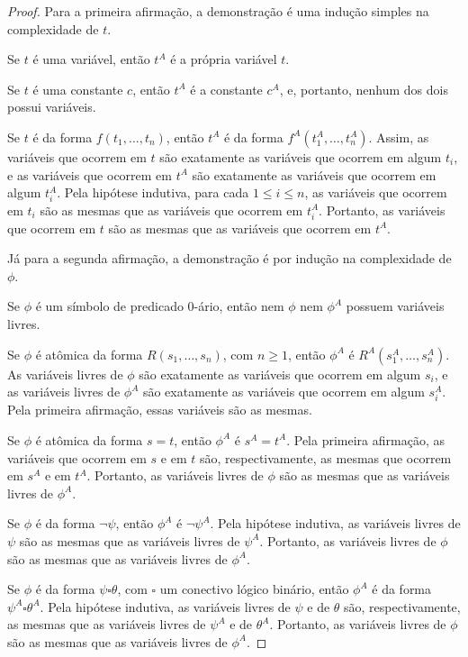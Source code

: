 \begin{proof}
    Para a primeira afirmação, a demonstração é uma indução simples na complexidade de $t$.

    Se $t$ é uma variável, então $t^A$ é a própria variável $t$.

    Se $t$ é uma constante $c$, então $t^A$ é a constante $c^A$, e, portanto, nenhum dos dois possui variáveis.

    Se $t$ é da forma $f(t_1,\dots,t_n)$, então $t^A$ é da forma $f^A(t_1^A,\dots,t_n^A)$.
    Assim, as variáveis que ocorrem em $t$ são exatamente as variáveis que ocorrem em algum $t_i$, e as variáveis que ocorrem em $t^A$ são exatamente as variáveis que ocorrem em algum $t_i^A$.
    Pela hipótese indutiva, para cada $1\leq i\leq n$, as variáveis que ocorrem em $t_i$ são as mesmas que as variáveis que ocorrem em $t_i^A$.
    Portanto, as variáveis que ocorrem em $t$ são as mesmas que as variáveis que ocorrem em $t^A$.

    Já para a segunda afirmação, a demonstração é por indução na complexidade de $\phi$.

    Se $\phi$ é um símbolo de predicado $0$-ário, então nem $\phi$ nem $\phi^A$ possuem variáveis livres.

    Se $\phi$ é atômica da forma $R(s_1,\dots,s_n)$, com $n\geq 1$, então $\phi^A$ é $R^A(s_1^A,\dots,s_n^A)$.
    As variáveis livres de $\phi$ são exatamente as variáveis que ocorrem em algum $s_i$, e as variáveis livres de $\phi^A$ são exatamente as variáveis que ocorrem em algum $s_i^A$.
    Pela primeira afirmação, essas variáveis são as mesmas.

    Se $\phi$ é atômica da forma $s=t$, então $\phi^A$ é $s^A=t^A$.
    Pela primeira afirmação, as variáveis que ocorrem em $s$ e em $t$ são, respectivamente, as mesmas que ocorrem em $s^A$ e em $t^A$.
    Portanto, as variáveis livres de $\phi$ são as mesmas que as variáveis livres de $\phi^A$.

    Se $\phi$ é da forma $\neg\psi$, então $\phi^A$ é $\neg\psi^A$.
    Pela hipótese indutiva, as variáveis livres de $\psi$ são as mesmas que as variáveis livres de $\psi^A$.
    Portanto, as variáveis livres de $\phi$ são as mesmas que as variáveis livres de $\phi^A$.

    Se $\phi$ é da forma $\psi\square\theta$, com $\square$ um conectivo lógico binário, então $\phi^A$ é da forma $\psi^A\square\theta^A$.
    Pela hipótese indutiva, as variáveis livres de $\psi$ e de $\theta$ são, respectivamente, as mesmas que as variáveis livres de $\psi^A$ e de $\theta^A$.
    Portanto, as variáveis livres de $\phi$ são as mesmas que as variáveis livres de $\phi^A$.


\end{proof}
